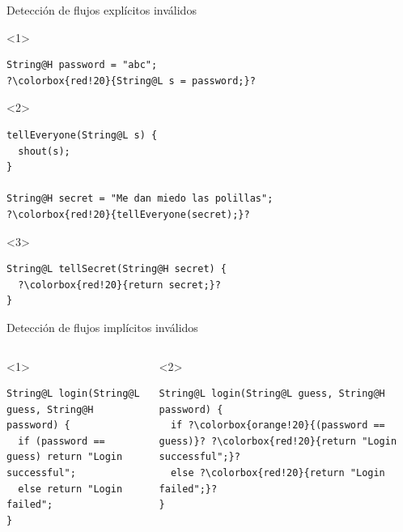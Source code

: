\documentclass[aspectratio=169,10pt]{beamer}
\begin{document}
\begin{frame}[fragile]{Detección de flujos explícitos inválidos}
\begin{onlyenv}<1>
	\begin{center}
\begin{lstlisting}[escapechar=?,basicstyle=\fontsize{9}{9}\ttfamily]
String@H password = "abc";
?\colorbox{red!20}{String@L s = password;}?
\end{lstlisting}
	\end{center}
\end{onlyenv}

\begin{onlyenv}<2>
	\begin{center}
\begin{lstlisting}[escapechar=?,basicstyle=\fontsize{9}{9}\ttfamily]
tellEveryone(String@L s) {
  shout(s);
}

String@H secret = "Me dan miedo las polillas";
?\colorbox{red!20}{tellEveryone(secret);}?
\end{lstlisting}
	\end{center}
\end{onlyenv}

\begin{onlyenv}<3>
	\begin{center}
\begin{lstlisting}[escapechar=?,basicstyle=\fontsize{9}{9}\ttfamily]
String@L tellSecret(String@H secret) {
  ?\colorbox{red!20}{return secret;}?
}
\end{lstlisting}
	\end{center}
\end{onlyenv}
\end{frame}

\begin{frame}[fragile]{Detección de flujos implícitos inválidos}
	\begin{columns}[T,onlytextwidth]
		\begin{onlyenv}<1>
\begin{lstlisting}[basicstyle=\fontsize{6.5}{8.3}\ttfamily]
String@L login(String@L guess, String@H password) {
  if (password == guess) return "Login successful";
  else return "Login failed";
}
\end{lstlisting}
		\end{onlyenv}
		\begin{onlyenv}<2>
\begin{lstlisting}[escapechar=?,basicstyle=\fontsize{6.5}{8.3}\ttfamily]
String@L login(String@L guess, String@H password) {
  if ?\colorbox{orange!20}{(password == guess)}? ?\colorbox{red!20}{return "Login successful";}?
  else ?\colorbox{red!20}{return "Login failed";}?
}
\end{lstlisting}
		\end{onlyenv}

	\end{columns}
\end{frame}
\end{document}
